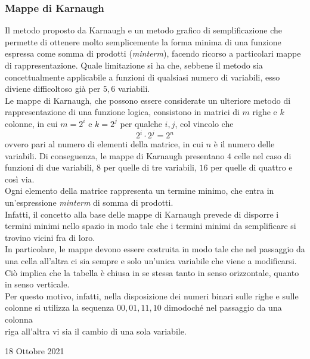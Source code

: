 \documentclass[a4paper]{extarticle}
\begin{document}
\subsubsection{Mappe di Karnaugh}
Il metodo proposto da Karnaugh e un metodo grafico di semplificazione che permette di ottenere molto semplicemente la forma minima di una funzione espressa come somma di prodotti (\textit{minterm}), facendo ricorso a particolari mappe di rappresentazione. Quale limitazione si ha che, sebbene il metodo sia concettualmente applicabile a funzioni di qualsiasi numero di variabili, esso diviene difficoltoso già per \(5, 6\) variabili.\\
Le mappe di Karnaugh, che possono essere considerate un ulteriore metodo di rappresentazione di una funzione logica, consistono in matrici di \(m\) righe e \(k\) colonne, in cui \(m = 2^i\) e \(k = 2^j\) per qualche \(i, j\), col vincolo che
\[2^i \cdot 2^j = 2^n\]
ovvero pari al numero di elementi della matrice, in cui \(n\) è il numero delle variabili. Di conseguenza, le mappe di Karnaugh presentano \(4\) celle nel caso di funzioni di due variabili, \(8\) per quelle di tre variabili, \(16\) per quelle di quattro e così via.\\
Ogni elemento della matrice rappresenta un termine minimo, che entra in un’espressione \textit{minterm} di somma di prodotti.\\
Infatti, il concetto alla base delle mappe di Karnaugh prevede di disporre i termini minimi nello spazio in modo tale che i termini minimi da semplificare si trovino vicini fra di loro.\\
In particolare, le mappe devono essere costruita in modo tale che nel passaggio da una cella all'altra ci sia sempre e solo un'unica variabile che viene a modificarsi. Ciò implica che la tabella è chiusa in se stessa tanto in senso orizzontale, quanto in senso verticale.\\
Per questo motivo, infatti, nella disposizione dei numeri binari sulle righe e sulle colonne si utilizza la sequenza \(00, 01, 11, 10\) dimodoché nel passaggio da una colonna\\riga all'altra vi sia il cambio di una sola variabile.

\newpage
\begin{center}
    18 Ottobre 2021
\end{center}
\end{document}
